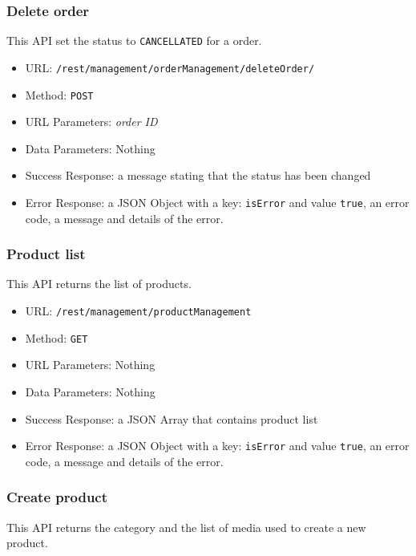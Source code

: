 \subsubsection*{Delete order}
This API set the status to \texttt{CANCELLATED} for a order.

\begin{itemize}
    \item URL: \texttt{/rest/management/orderManagement/deleteOrder/}
    \item Method: \texttt{POST}
    \item URL Parameters:  \textit{order ID}
    \item Data Parameters: Nothing
    \item Success Response: a message stating that the status has been changed
    \item Error Response: a JSON Object with a key: \texttt{isError}  and value \texttt{true}, an error code, a message and details of the error.
\end{itemize}

\subsubsection*{Product list}
This API returns the list of products.

\begin{itemize}
    \item URL: \texttt{/rest/management/productManagement}
    \item Method: \texttt{GET}
    \item URL Parameters: Nothing
    \item Data Parameters: Nothing
    \item Success Response: a JSON Array that contains product list 
    \item Error Response: a JSON Object with a key: \texttt{isError}  and value \texttt{true}, an error code, a message and details of the error.
\end{itemize}

\subsubsection*{Create product}
This API returns the category and the list of media used to create a new product.

